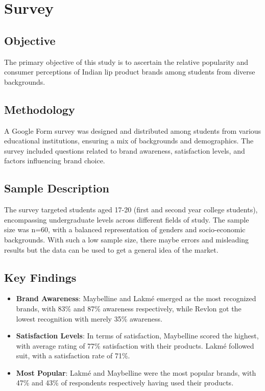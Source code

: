 \documentclass{article}
\begin{document}
\section{Survey}

\subsection{Objective}
The primary objective of this study is to ascertain the relative popularity and consumer perceptions of Indian lip product brands among students from diverse backgrounds.

\subsection{Methodology}
A Google Form survey was designed and distributed among students from various educational institutions, ensuring a mix of backgrounds and demographics. The survey included questions related to brand awareness,  satisfaction levels, and factors influencing brand choice.

\subsection{Sample Description}
The survey targeted students aged 17-20 (first and second year college students), encompassing undergraduate levels across different fields of study. The sample size was n=60, with a balanced representation of genders and socio-economic backgrounds. With such a low sample size, there maybe errors and misleading results but the data can be used to get a general idea of the market.

\subsection{Key Findings}
\begin{itemize}
    \item \textbf{Brand Awareness}: Maybelline and Lakmé emerged as the most recognized brands, with 83\% and 87\% awareness respectively, while Revlon got the lowest recognition with merely 35\% awareness.

    \item \textbf{Satisfaction Levels}: In terms of satisfaction, Maybelline scored the highest, with average rating of 77\%  satisfaction with their products. Lakmé followed suit, with a satisfaction rate of 71\%.

    \item \textbf{Most Popular}: Lakmé and Maybelline were the most popular brands, with 47\% and 43\% of respondents respectively having used their products.
\end{itemize}
\end{document}

